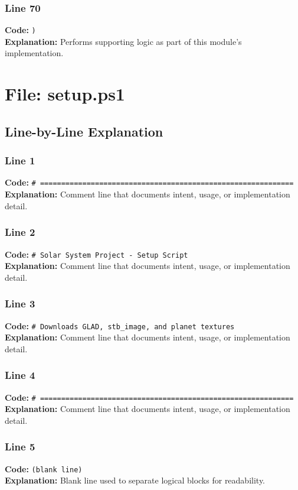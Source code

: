 \documentclass[11pt,a4paper]{article}
\begin{document}
\subsubsection*{Line 70}
\textbf{Code:} \verb|)|\\
\textbf{Explanation:} Performs supporting logic as part of this module's implementation.

\newpage
\section{File: setup.ps1}
\subsection{Line-by-Line Explanation}
\subsubsection*{Line 1}
\textbf{Code:} \verb|# ============================================================|\\
\textbf{Explanation:} Comment line that documents intent, usage, or implementation detail.

\subsubsection*{Line 2}
\textbf{Code:} \verb|# Solar System Project - Setup Script|\\
\textbf{Explanation:} Comment line that documents intent, usage, or implementation detail.

\subsubsection*{Line 3}
\textbf{Code:} \verb|# Downloads GLAD, stb_image, and planet textures|\\
\textbf{Explanation:} Comment line that documents intent, usage, or implementation detail.

\subsubsection*{Line 4}
\textbf{Code:} \verb|# ============================================================|\\
\textbf{Explanation:} Comment line that documents intent, usage, or implementation detail.

\subsubsection*{Line 5}
\textbf{Code:} \texttt{(blank line)}\\
\textbf{Explanation:} Blank line used to separate logical blocks for readability.
\end{document}
